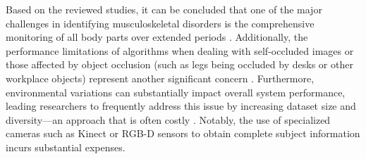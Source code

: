 \documentclass[lettersize,journal]{IEEEtran}
\begin{document}

Based on the reviewed studies, it can be concluded that one of the major challenges in identifying musculoskeletal disorders is the comprehensive monitoring of all body parts over extended periods \cite{rodrigues2022ergonomic}. Additionally, the performance limitations of algorithms when dealing with self-occluded images or those affected by object occlusion (such as legs being occluded by desks or other workplace objects) represent another significant concern \cite{rodrigues2022ergonomic}. Furthermore, environmental variations can substantially impact overall system performance, leading researchers to frequently address this issue by increasing dataset size and diversity—an approach that is often costly \cite{menanno2024ergonomic}. Notably, the use of specialized cameras such as Kinect or RGB-D sensors to obtain complete subject information incurs substantial expenses.
\end{document}
